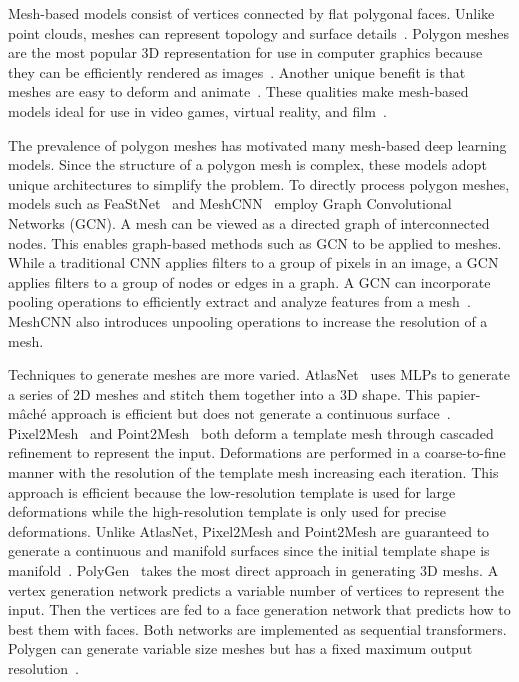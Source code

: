 Mesh-based models consist of vertices connected by flat polygonal faces. Unlike point clouds, meshes can represent topology and surface details~\cite{Xiao2020}. Polygon meshes are the most popular 3D representation for use in computer graphics because they can be efficiently rendered as images~\cite{Watt1996}. Another unique benefit is that meshes are easy to deform and animate~\cite{Wang2018}. These qualities make mesh-based models ideal for use in video games, virtual reality, and film~\cite{Nash2020}.

The prevalence of polygon meshes has motivated many mesh-based deep learning models. Since the structure of a polygon mesh is complex, these models adopt unique architectures to simplify the problem. To directly process polygon meshes, models such as FeaStNet~\cite{Verma2018} and MeshCNN~\cite{Hanocka2019} employ Graph Convolutional Networks (GCN). A mesh can be viewed as a directed graph of interconnected nodes. This enables graph-based methods such as GCN to be applied to meshes. While a traditional CNN applies filters to a group of pixels in an image, a GCN applies filters to a group of nodes or edges in a graph. A GCN can incorporate pooling operations to efficiently extract and analyze features from a mesh~\cite{Verma2018}. MeshCNN also introduces unpooling operations to increase the resolution of a mesh.

Techniques to generate meshes are more varied. AtlasNet~\cite{Groueix2018} uses MLPs to generate a series of 2D meshes and stitch them together into a 3D shape. This papier-m\^{a}ch\'{e} approach is efficient but does not generate a continuous surface~\cite{Groueix2018}. Pixel2Mesh~\cite{Wang2018} and Point2Mesh~\cite{Hanocka2020} both deform a template mesh through cascaded refinement to represent the input. Deformations are performed in a coarse-to-fine manner with the resolution of the template mesh increasing each iteration. This approach is efficient because the low-resolution template is used for large deformations while the high-resolution template is only used for precise deformations. Unlike AtlasNet, Pixel2Mesh and Point2Mesh are guaranteed to generate a continuous and manifold surfaces since the initial template shape is manifold~\cite{Wang2018, Hanocka2020}. PolyGen~\cite{Nash2020} takes the most direct approach in generating 3D meshs. A vertex generation network predicts a variable number of vertices to represent the input. Then the vertices are fed to a face generation network that predicts how to best them with faces. Both networks are implemented as sequential transformers. Polygen can generate variable size meshes but has a fixed maximum output resolution~\cite{Nash2020}.


